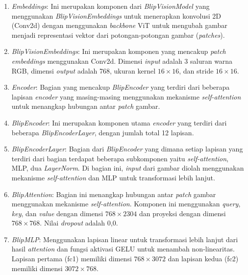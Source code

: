\begin{enumerate}

    \item \textit{Embeddings}: Ini merupakan komponen dari \textit{BlipVisionModel} yang menggunakan \textit{BlipVisionEmbeddings} untuk menerapkan konvolusi 2D (Conv2d) dengan menggunakan \textit{backbone} ViT untuk mengubah gambar menjadi representasi vektor dari potongan-potongan gambar (\textit{patches}).

    \item \textit{BlipVisionEmbeddings}: Ini merupakan komponen yang mencakup \textit{patch embeddings} menggunakan Conv2d. Dimensi \textit{input} adalah 3 saluran warna RGB, dimensi \textit{output} adalah 768, ukuran kernel $16 \times 16$, dan stride $16 \times 16$.

    \item \textit{Encoder}: Bagian yang mencakup \textit{BlipEncoder} yang terdiri dari beberapa lapisan \textit{encoder} yang masing-masing menggunakan mekanisme \textit{self-attention} untuk menangkap hubungan antar \textit{patch} gambar.

    \item \textit{BlipEncoder}: Ini merupakan komponen utama \textit{encoder} yang terdiri dari beberapa \textit{BlipEncoderLayer}, dengan jumlah total 12 lapisan.

    \item \textit{BlipEncoderLayer}: Bagian dari \textit{BlipEncoder} yang dimana setiap lapisan yang terdiri dari bagian terdapat beberapa subkomponen yaitu \textit{self-attention}, MLP, dua \textit{LayerNorm}. Di bagian ini, \textit{input} dari gambar diolah menggunakan mekanisme \textit{self-attention} dan MLP untuk transformasi lebih lanjut.

    \item \textit{BlipAttention}: Bagian ini menangkap hubungan antar \textit{patch} gambar menggunakan mekanisme \textit{self-attention}. Komponen ini menggunakan \textit{query}, \textit{key}, dan \textit{value} dengan dimensi $768 \times 2304$ dan proyeksi dengan dimensi $768 \times 768$. Nilai \textit{dropout} adalah 0,0.

    \item \textit{BlipMLP}: Menggunakan lapisan linear untuk transformasi lebih lanjut dari hasil \textit{attention} dan fungsi aktivasi GELU untuk menambah non-linearitas. Lapisan pertama (fc1) memiliki dimensi $768 \times 3072$ dan lapisan kedua (fc2) memiliki dimensi $3072 \times 768$.


\end{enumerate}
